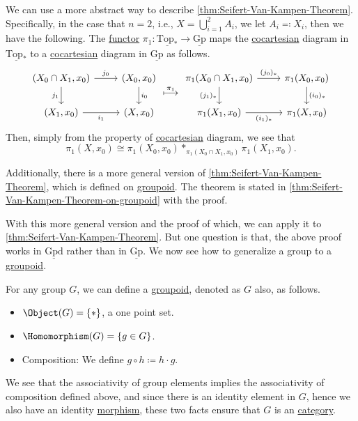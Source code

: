 \begin{remark}
	We can use a more abstract way to describe \autoref{thm:Seifert-Van-Kampen-Theorem}. Specifically, in the case that \(n = 2\), i.e., \(X = \bigcup\limits_{i=1}^{2} A_{i} \),
	we let \(A_{i} \eqqcolon X_{i} \), then we have the following. The \hyperref[def:functor]{functor} \(\pi _1\colon \underline{\mathrm{Top}_{\ast}}\to \underline{\mathrm{Gp}}\)
	maps the \hyperref[def:cocartesian]{cocartesian} diagram in \(\underline{\mathrm{Top} _\ast}\) to a \hyperref[def:cocartesian]{cocartesian} diagram in \(\underline{\mathrm{Gp} }\)
	as follows.
	\[
		\begin{tikzcd}
			{(X_0\cap X_1, x_0)} & {(X_0, x_0)} \\
			{(X_1, x_0)} & {(X, x_0)}
			\arrow["{j_0}", from=1-1, to=1-2]
			\arrow["{i_0}", from=1-2, to=2-2]
			\arrow["{i_1}"', from=2-1, to=2-2]
			\arrow["{j_1}"', from=1-1, to=2-1]
		\end{tikzcd}\overset{\pi _1}{\longmapsto}
		\begin{tikzcd}
			{\pi_1(X_0\cap X_1, x_0)} & {\pi_1(X_0, x_0)} \\
			{\pi_1(X_1, x_0)} & {\pi_1(X, x_0)}
			\arrow["{(j_0)_\ast}", from=1-1, to=1-2]
			\arrow["{(i_0)_\ast}", from=1-2, to=2-2]
			\arrow["{(i_1)_\ast}"', from=2-1, to=2-2]
			\arrow["{(j_1)_\ast}"', from=1-1, to=2-1]
		\end{tikzcd} \]
	Then, simply from the property of \hyperref[def:cocartesian]{cocartesian} diagram, we see that
	\[
		\pi _1(X, x_0)\cong \pi _1(X_0, x_0)\ast_{\pi _1(X_0 \cap X_1, x_0)}\pi _1(X_1, x_0).
	\]
\end{remark}

Additionally, there is a more general version of \autoref{thm:Seifert-Van-Kampen-Theorem}, which is defined on \hyperref[def:groupoid]{groupoid}. The theorem is
stated in \autoref{thm:Seifert-Van-Kampen-Theorem-on-groupoid} with the proof.

With this more general version and the proof of which, we can apply it to \autoref{thm:Seifert-Van-Kampen-Theorem}. But one question is that, the above proof
works in \(\underline{\mathrm{Gpd}}\) rather than in \(\underline{\mathrm{Gp}}\). We now see how to generalize a group to a \hyperref[def:groupoid]{groupoid}.

For any group \(G\), we can define a \hyperref[def:groupoid]{groupoid}, denoted as \(G\) also, as follows.
\begin{itemize}
	\item \(\Object (G) = \{\ast \}\), a one point set.
	\item \(\Homomorphism (G) = \{g\in G\}\).
	\item Composition: We define \(g\circ h \coloneqq h\cdot g\).
\end{itemize}
We see that the associativity of group elements implies the associativity of composition defined above, and since there is an identity element in \(G\), hence we also have
an identity \hyperref[def:morphism]{morphism}, these two facts ensure that \(G\) is an \hyperref[def:category]{category}.

